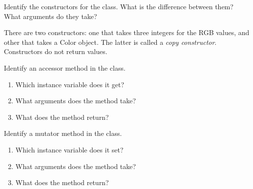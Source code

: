

\Q Identify the constructors for the  class. What is the difference between them? What arguments do they take?

\begin{answer}
There are two constructors: one that takes three integers for the RGB values, and other that takes a Color object. The latter is called a \emph{copy constructor}. Constructors do not return values.
\end{answer}


\Q Identify an accessor method in the  class.
\begin{enumerate}[itemsep=1pt]
\item Which instance variable does it get? 
\item What arguments does the method take? 
\item What does the method return? 
\end{enumerate}


\Q Identify a mutator method in the  class.
\begin{enumerate}[itemsep=1pt]
\item Which instance variable does it set? 
\item What arguments does the method take? 
\item What does the method return? 
\end{enumerate}
